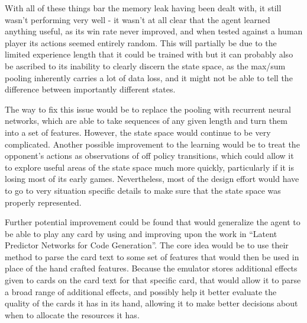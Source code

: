 With all of these things bar the memory leak having been dealt with, it still wasn't performing very well - it wasn't at all clear that the agent learned anything useful, as its win rate never improved, and when tested against a human player its actions seemed entirely random. This will partially be due to the limited experience length that it could be trained with but it can probably also be ascribed to its inability to clearly discern the state space, as the max/sum pooling inherently carries a lot of data loss, and it might not be able to tell the difference between importantly different states.

The way to fix this issue would be to replace the pooling with recurrent neural networks, which are able to take sequences of any given length and turn them into a set of features. However, the state space would continue to be very complicated. Another possible improvement to the learning would be to treat the opponent's actions as observations of off policy transitions, which could allow it to explore useful areas of the state space much more quickly, particularly if it is losing most of its early games. Nevertheless, most of the design effort would have to go to very situation specific details to make sure that the state space was properly represented.

Further potential improvement could be found that would generalize the agent to be able to play any card by using and improving upon the work in ``Latent Predictor Networks for Code Generation''\cite{ling2016latent}. The core idea would be to use their method to parse the card text to some set of features that would then be used in place of the hand crafted features. Because the emulator stores additional effects given to cards on the card text for that specific card, that would allow it to parse a broad range of additional effects, and possibly help it better evaluate the quality of the cards it has in its hand, allowing it to make better decisions about when to allocate the resources it has.